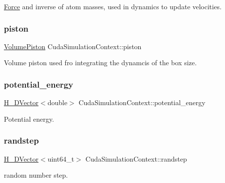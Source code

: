 \hyperlink{classForce}{Force} and inverse of atom masses, used in dynamics to update velocities. 

\hypertarget{classCudaSimulationContext_a9077736cc7f5dae5c741a2ebe7c21767}{}\label{classCudaSimulationContext_a9077736cc7f5dae5c741a2ebe7c21767} 
\subsubsection{\texorpdfstring{piston}{piston}}
{\footnotesize\ttfamily \hyperlink{structVolumePiston}{Volume\+Piston} Cuda\+Simulation\+Context\+::piston}



Volume piston used fro integrating the dynamcis of the box size. 

\hypertarget{classCudaSimulationContext_a353985244fa6f2dd2659120124f63bb5}{}\label{classCudaSimulationContext_a353985244fa6f2dd2659120124f63bb5} 
\subsubsection{\texorpdfstring{potential\+\_\+energy}{potential\_energy}}
{\footnotesize\ttfamily \hyperlink{structH__DVector}{H\+\_\+\+D\+Vector}$<$double$>$ Cuda\+Simulation\+Context\+::potential\+\_\+energy}



Potential energy. 

\hypertarget{classCudaSimulationContext_aedf3a214b43fd5155f17ae8f3ce758e8}{}\label{classCudaSimulationContext_aedf3a214b43fd5155f17ae8f3ce758e8} 
\subsubsection{\texorpdfstring{randstep}{randstep}}
{\footnotesize\ttfamily \hyperlink{structH__DVector}{H\+\_\+\+D\+Vector}$<$uint64\+\_\+t$>$ Cuda\+Simulation\+Context\+::randstep}



random number step. 

